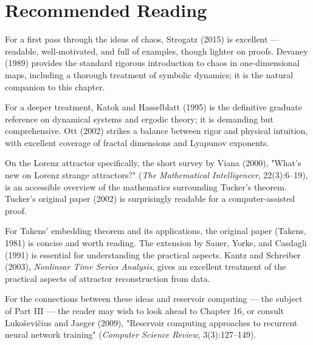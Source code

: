 \section*{Recommended Reading}

For a first pass through the ideas of chaos, Strogatz (2015) is excellent --- readable, well-motivated, and full of examples, though lighter on proofs. Devaney (1989) provides the standard rigorous introduction to chaos in one-dimensional maps, including a thorough treatment of symbolic dynamics; it is the natural companion to this chapter.

For a deeper treatment, Katok and Hasselblatt (1995) is the definitive graduate reference on dynamical systems and ergodic theory; it is demanding but comprehensive. Ott (2002) strikes a balance between rigor and physical intuition, with excellent coverage of fractal dimensions and Lyapunov exponents.

On the Lorenz attractor specifically, the short survey by Viana (2000), "What's new on Lorenz strange attractors?" (\textit{The Mathematical Intelligencer}, 22(3):6--19), is an accessible overview of the mathematics surrounding Tucker's theorem. Tucker's original paper (2002) is surprisingly readable for a computer-assisted proof.

For Takens' embedding theorem and its applications, the original paper (Takens, 1981) is concise and worth reading. The extension by Sauer, Yorke, and Casdagli (1991) is essential for understanding the practical aspects. Kantz and Schreiber (2003), \textit{Nonlinear Time Series Analysis}, gives an excellent treatment of the practical aspects of attractor reconstruction from data.

For the connections between these ideas and reservoir computing --- the subject of Part III --- the reader may wish to look ahead to Chapter 16, or consult Lukoševičius and Jaeger (2009), "Reservoir computing approaches to recurrent neural network training" (\textit{Computer Science Review}, 3(3):127--149).
